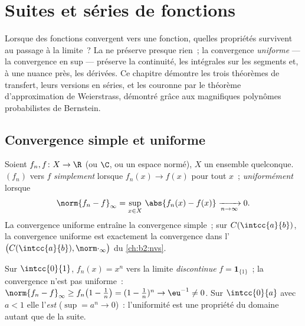 \chapter{Suites et séries de fonctions}\label{ch:b2:funcseq}

Lorsque des fonctions convergent vers une fonction, quelles propriétés
survivent au passage à la limite~? La  ne préserve
presque rien~; la convergence \emph{uniforme} --- la convergence en 
sup --- préserve la continuité, les intégrales sur les segments et, à une
nuance près, les dérivées. Ce chapitre démontre les trois théorèmes de
transfert, leurs versions en séries, et les couronne par le théorème
d'approximation de Weierstrass, démontré grâce aux magnifiques polynômes
probabilistes de Bernstein.

\section{Convergence simple et uniforme}

\begin{definition}\label{def:b2:funcseq:def}
Soient $f_n, f \colon X \to \R$ (ou $\C$, ou un espace normé), $X$ un
ensemble quelconque. $(f_n)$  vers $f$
\emph{simplement} lorsque $f_n(x) \to
f(x)$ pour tout $x$~; \emph{uniformément}
lorsque
\[
\norm{f_n - f}_\infty = \sup_{x \in X}\, \abs{f_n(x) - f(x)}
\xrightarrow[n \to \infty]{} 0 .
\]
La convergence uniforme entraîne la convergence simple~; sur
$C(\intcc{a}{b})$, la convergence uniforme est exactement la convergence
dans l'
$\bigl(C(\intcc{a}{b}), \norm\cdot_\infty\bigr)$ du
\cref{ch:b2:nvs}.
\end{definition}

\begin{example}\label{ex:b2:funcseq:xn}
Sur $\intcc{0}{1}$, $f_n(x) = x^n$   vers la limite
\emph{discontinue} $f = \mathbf{1}_{\{1\}}$~; la convergence
n'est pas uniforme~: $\norm{f_n - f}_\infty \geq f_n\bigl(1 -
\tfrac1n\bigr) = (1 - \tfrac1n)^n \to \eu^{-1} \neq 0$. Sur
$\intcc{0}{a}$ avec $a < 1$ elle l'\emph{est} ($\sup = a^n \to
0$)~: l'uniformité est une propriété du domaine autant que de la
suite.
\end{example}

